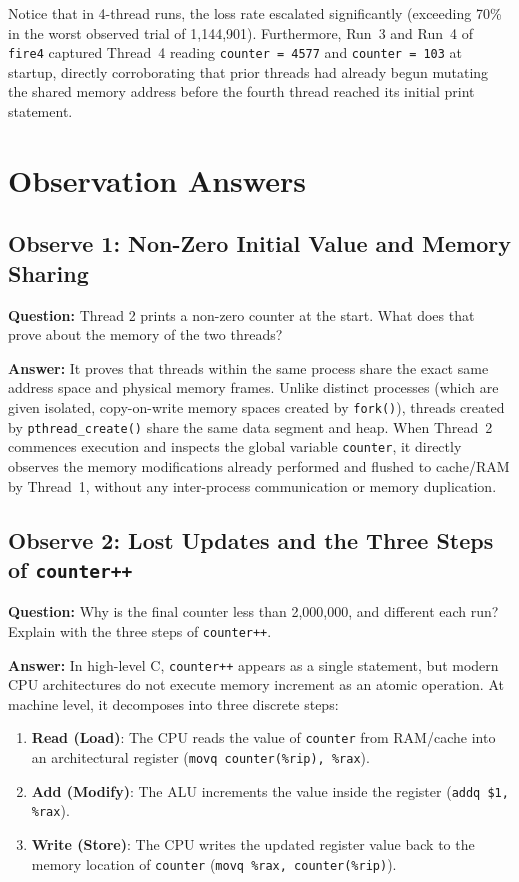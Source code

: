 \documentclass[12pt,a4paper]{article}
\begin{document}
Notice that in 4-thread runs, the loss rate escalated significantly (exceeding 70\% in the worst observed trial of 1,144,901). Furthermore, Run~3 and Run~4 of \texttt{fire4} captured Thread~4 reading \texttt{counter = 4577} and \texttt{counter = 103} at startup, directly corroborating that prior threads had already begun mutating the shared memory address before the fourth thread reached its initial print statement.

\section{Observation Answers}

\subsection{Observe 1: Non-Zero Initial Value and Memory Sharing}
\textbf{Question:} Thread 2 prints a non-zero counter at the start. What does that prove about the memory of the two threads?

\textbf{Answer:}
It proves that threads within the same process share the exact same address space and physical memory frames. Unlike distinct processes (which are given isolated, copy-on-write memory spaces created by \texttt{fork()}), threads created by \texttt{pthread\_create()} share the same data segment and heap. When Thread~2 commences execution and inspects the global variable \texttt{counter}, it directly observes the memory modifications already performed and flushed to cache/RAM by Thread~1, without any inter-process communication or memory duplication.

\subsection{Observe 2: Lost Updates and the Three Steps of \texttt{counter++}}
\textbf{Question:} Why is the final counter less than 2,000,000, and different each run? Explain with the three steps of \texttt{counter++}.

\textbf{Answer:}
In high-level C, \texttt{counter++} appears as a single statement, but modern CPU architectures do not execute memory increment as an atomic operation. At machine level, it decomposes into three discrete steps:
\begin{enumerate}
    \item \textbf{Read (Load)}: The CPU reads the value of \texttt{counter} from RAM/cache into an architectural register (\texttt{movq counter(\%rip), \%rax}).
    \item \textbf{Add (Modify)}: The ALU increments the value inside the register (\texttt{addq \$1, \%rax}).
    \item \textbf{Write (Store)}: The CPU writes the updated register value back to the memory location of \texttt{counter} (\texttt{movq \%rax, counter(\%rip)}).
\end{enumerate}
\end{document}
